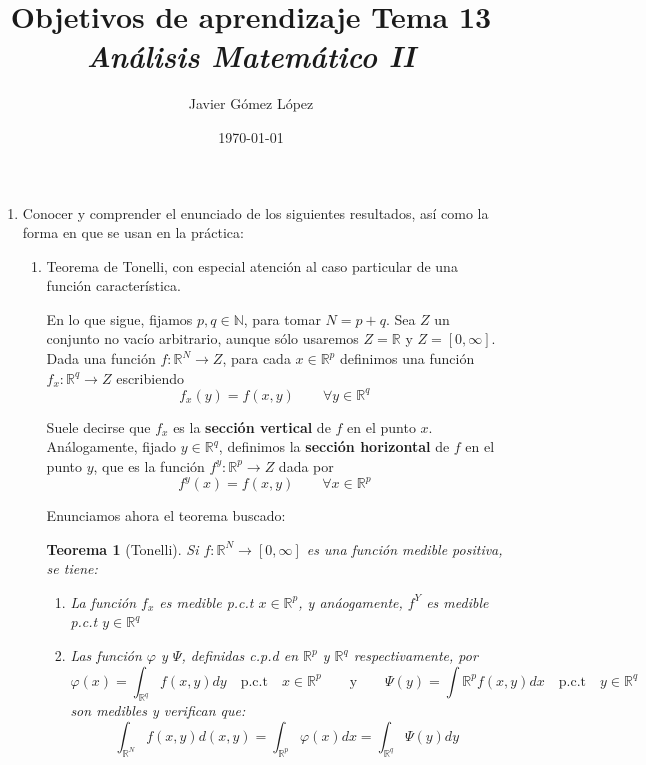 \documentclass[a4paper, 12pt]{article}
\title{\textbf{Objetivos de aprendizaje Tema 13} \\ \textit{Análisis Matemático II}}
\author{Javier Gómez López}
\date{\today}
\newtheorem*{teorema*}{Teorema}
\begin{document}
\maketitle

\begin{enumerate}[label=\textbf{\arabic*}.]
	
	\item Conocer y comprender el enunciado de los siguientes resultados, así como la forma en que se usan en la práctica:
	
	\begin{enumerate}[label=\textit{\alph*)}]
		\item Teorema de Tonelli, con especial atención al caso particular de una función característica.
		
		En lo que sigue, fijamos \(p,q \in  \mathbb{N}\), para tomar \(N = p + q\). Sea \(Z\) un conjunto no vacío arbitrario, aunque sólo usaremos \(Z = \mathbb{R}\) y \(Z = [0,\infty]\). Dada una función \(f: \mathbb{R}^N \to Z\), para cada \(x \in \mathbb{R}^p\) definimos una función \(f_x : \mathbb{R}^q \to Z\) escribiendo
		\[
			f_x (y) = f(x,y) \qquad \forall y \in \mathbb{R}^q
		\]
		
		Suele decirse que \(f_x\) es la \textbf{sección vertical} de \(f\) en el punto \(x\). Análogamente, fijado \(y \in \mathbb{R}^q\), definimos la \textbf{sección horizontal} de \(f\) en el punto \(y\), que es la función \(f^y : \mathbb{R}^p \to Z\) dada por
		\[
			f^y (x) = f(x,y) \qquad \forall x \in \mathbb{R}^p
		\]
		
		Enunciamos ahora el teorema buscado:
		\begin{teorema*}[Tonelli]
		Si \(f: \mathbb{R}^N \to [0,\infty]\) es una función medible positiva, se tiene:
		\begin{enumerate}[label=\textit{(\roman*)}]
			\item La función \(f_x\) es medible p.c.t \(x \in \mathbb{R}^p\), y anáogamente, \(f^Y\) es medible p.c.t \(y \in \mathbb{R}^q\)
			\item Las función \(\varphi\) y \(\Psi\), definidas c.p.d en \(\mathbb{R}^p\) y \(\mathbb{R}^q\) respectivamente, por
			\[
				\varphi (x) = \int_{\mathbb{R}^q} f(x,y) dy \quad \text{p.c.t} \quad x \in \mathbb{R}^p \qquad \text{y} \qquad \Psi (y) = \int{\mathbb{R}^p} f(x,y) dx \quad \text{p.c.t} \quad y \in \mathbb{R}^q
			\]
			son medibles y verifican que:
			\[
				\int_{\mathbb{R}^N} f(x,y) d(x,y) = \int_{\mathbb{R}^p} \varphi (x) dx = \int_{\mathbb{R}^q} \Psi (y) dy
			\]
		\end{enumerate}
		\end{teorema*}
		

\end{enumerate}
\end{enumerate}
\end{document}

